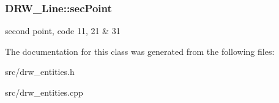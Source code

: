 \subsubsection[{sec\+Point}]{ D\+R\+W\+\_\+\+Line\+::sec\+Point}\label{class_d_r_w___line_afba62212864227b610be3e2a4e7ac307}
second point, code 11, 21 \& 31 

The documentation for this class was generated from the following files\+:\begin{DoxyCompactItemize}
\item 
src/drw\+\_\+entities.\+h\item 
src/drw\+\_\+entities.\+cpp\end{DoxyCompactItemize}
